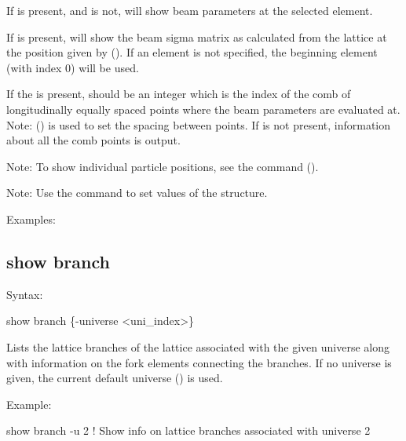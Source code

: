 {{{{{{{{If  is present, and  is not,  will show beam
parameters at the selected element. 

If  is present,  will show the beam sigma matrix as calculated from the
lattice at the position given by  (). If an
element is not specified, the beginning element (with index 0) will be used.

If the  is present,  should be an integer which is the index
of the comb of longitudinally equally spaced points where the beam parameters are evaluated at.
Note:  () is used to set the spacing between points.
If  is not present, information about all the comb points is output.

Note: To show individual particle positions, see the  command
().

Note: Use the  command to set values of the  structure.

Examples:


\subsection{show branch}
\label{s:show.branch}

Syntax:
\begin{example}
  show branch \{-universe <uni_index>\}
\end{example}

Lists the lattice branches of the lattice associated with the given universe along with information
on the fork elements connecting the branches.  If no universe is given, the current default universe
() is used.

Example:
\begin{example}
  show branch -u 2     ! Show info on lattice branches associated with universe 2
\end{example}


}}}}}}}}
